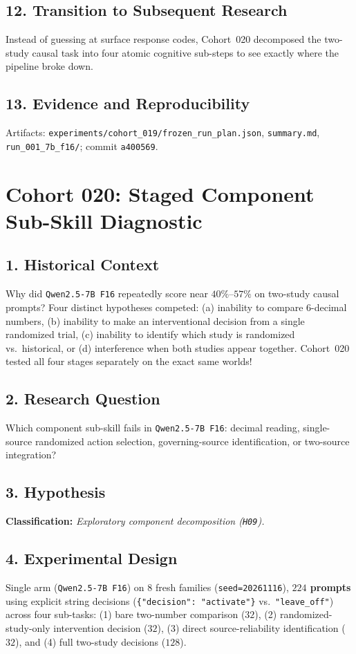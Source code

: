 \subsection*{12. Transition to Subsequent Research}
Instead of guessing at surface response codes, Cohort~020 decomposed the two-study causal task into four atomic cognitive sub-steps to see exactly where the pipeline broke down.

\subsection*{13. Evidence and Reproducibility}
Artifacts: \texttt{experiments/cohort\_019/frozen\_run\_plan.json}, \texttt{summary.md}, \texttt{run\_001\_7b\_f16/}; commit \texttt{a400569}.

\section{Cohort 020: Staged Component Sub-Skill Diagnostic}

\subsection*{1. Historical Context}
Why did \texttt{Qwen2.5-7B F16} repeatedly score near $40\%$--$57\%$ on two-study causal prompts? Four distinct hypotheses competed: (a) inability to compare 6-decimal numbers, (b) inability to make an interventional decision from a single randomized trial, (c) inability to identify which study is randomized vs.\ historical, or (d) interference when both studies appear together. Cohort~020 tested all four stages separately on the exact same worlds!

\subsection*{2. Research Question}
Which component sub-skill fails in \texttt{Qwen2.5-7B F16}: decimal reading, single-source randomized action selection, governing-source identification, or two-source integration?

\subsection*{3. Hypothesis}
\textbf{Classification:} \emph{Exploratory component decomposition (\texttt{H09}).}

\subsection*{4. Experimental Design}
Single arm (\texttt{Qwen2.5-7B F16}) on $8$ fresh families (\texttt{seed=20261116}), \textbf{$224$ prompts} using explicit string decisions (\texttt{\{"decision": "activate"\}} vs.\ \texttt{"leave\_off"}) across four sub-tasks: (1) bare two-number comparison ($32$), (2) randomized-study-only intervention decision ($32$), (3) direct source-reliability identification ($32$), and (4) full two-study decisions ($128$).

